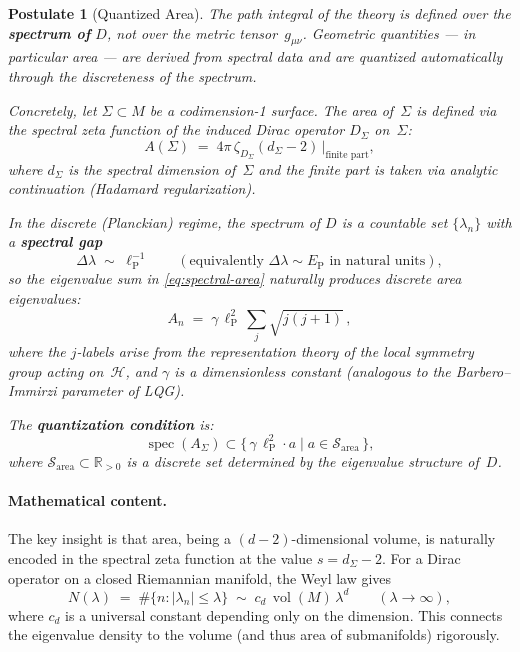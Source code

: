 \documentclass[12pt,a4paper]{article}
\theoremstyle{postulate}
\newtheorem{postulate}{Postulate}
\newcommand{\spec}{\operatorname{spec}}
\newcommand{\Hil}{\mathcal{H}}
\newcommand{\Dirac}{D}
\newcommand{\planck}{\ell_{\mathrm{P}}}
\newcommand{\Eplanck}{E_{\mathrm{P}}}
\begin{document}
\begin{postulate}[Quantized Area]\label{post:area}
The path integral of the theory is defined over the \textbf{spectrum of}
$\Dirac$, not over the metric tensor~$g_{\mu\nu}$.  Geometric quantities ---
in particular area --- are derived from spectral data and are quantized
automatically through the discreteness of the spectrum.

Concretely, let $\Sigma \subset M$ be a codimension-1 surface.  The area
of~$\Sigma$ is defined via the spectral zeta function of the induced Dirac
operator $\Dirac_\Sigma$ on~$\Sigma$:
\begin{equation}\label{eq:spectral-area}
  A(\Sigma) \;=\; 4\pi\,\zeta_{\Dirac_\Sigma}(d_\Sigma - 2)\,\Big|_{\text{finite part}},
\end{equation}
where $d_\Sigma$ is the spectral dimension of~$\Sigma$ and the finite part
is taken via analytic continuation (Hadamard regularization).

In the discrete (Planckian) regime, the spectrum of $\Dirac$ is a countable
set $\{\lambda_n\}$ with a \textbf{spectral gap}
\begin{equation}\label{eq:spectral-gap}
  \Delta\lambda \;\sim\; \planck^{-1}
  \qquad (\text{equivalently } \Delta\lambda \sim \Eplanck \text{ in natural units}),
\end{equation}
so the eigenvalue sum in \eqref{eq:spectral-area} naturally produces
discrete area eigenvalues:
\begin{equation}\label{eq:area-quanta}
  A_n \;=\; \gamma\,\planck^2\,\sum_{j}\sqrt{j(j+1)}\,,
\end{equation}
where the $j$-labels arise from the representation theory of the local
symmetry group acting on~$\Hil$, and $\gamma$ is a dimensionless constant
(analogous to the Barbero--Immirzi parameter of LQG).

The \textbf{quantization condition} is:
\begin{equation}\label{eq:area-quantization}
  \spec(A_\Sigma) \subset \bigl\{\,\gamma\,\planck^2 \cdot a \;\big|\;
  a \in \mathcal{S}_{\mathrm{area}}\,\bigr\},
\end{equation}
where $\mathcal{S}_{\mathrm{area}} \subset \mathbb{R}_{>0}$ is a discrete
set determined by the eigenvalue structure of~$\Dirac$.
\end{postulate}

\paragraph{Mathematical content.}
The key insight is that area, being a $(d{-}2)$-dimensional volume, is
naturally encoded in the spectral zeta function at the value $s = d_\Sigma - 2$.
For a Dirac operator on a closed Riemannian manifold, the Weyl law gives
\begin{equation}\label{eq:weyl}
  N(\lambda) \;=\; \#\{n : |\lambda_n| \leq \lambda\}
  \;\sim\; c_d\,\operatorname{vol}(M)\,\lambda^d
  \qquad (\lambda \to \infty),
\end{equation}
where $c_d$ is a universal constant depending only on the dimension.  This
connects the eigenvalue density to the volume (and thus area of submanifolds)
rigorously.
\end{document}

